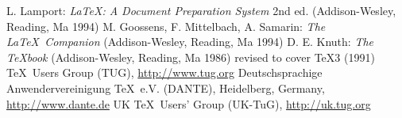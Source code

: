 \documentclass[graybox]{svmult}
\begin{document}
\begin{thebibliography}{[6]}
 L. Lamport: \textit{\LaTeX: A Document Preparation System} 2nd ed. (Addison-Wesley, Reading, Ma 1994)
 M. Goossens, F. Mittelbach, A. Samarin: \textit{The \LaTeX\ Companion} (Addison-Wesley, Reading, Ma 1994)
 D. E. Knuth: \textit{The \TeX book} (Addison-Wesley, Reading, Ma 1986) revised to cover \TeX3 (1991)
 \TeX\ Users Group (TUG), \url{http://www.tug.org}
 Deutschsprachige Anwendervereinigung \TeX\ e.V. (DANTE), Heidelberg, Germany, \url{http://www.dante.de}
 UK \TeX\ Users' Group (UK-TuG), \url{http://uk.tug.org}
\end{thebibliography}
\end{document}
